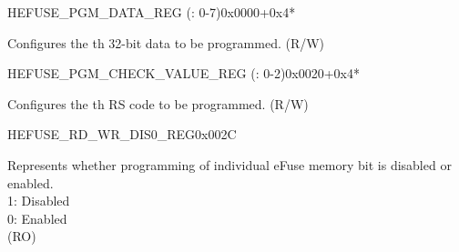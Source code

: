\begin{register}{H}{EFUSE\_PGM\_DATA\_REG (: 0-7)}{0x0000+0x4*}\label{regdesc:EFUSEPGMDATANREG}
    \regnewline%
    \begin{regdesc}\begin{reglist}
    \label{fielddesc:EFUSEPGMDATAN}\item [EFUSE\_PGM\_DATA\_\regindex{n}] Configures the th 32-bit data to be programmed. (R/W)
    \end{reglist}\end{regdesc}
    \end{register}


    \begin{register}{H}{EFUSE\_PGM\_CHECK\_VALUE\_REG (: 0-2)}{0x0020+0x4*}\label{regdesc:EFUSEPGMCHECKVALUENREG}
    \regnewline%
    \begin{regdesc}\begin{reglist}
    \label{fielddesc:EFUSEPGMRSDATAN}\item [EFUSE\_PGM\_RS\_DATA\_\regindex{n}] Configures the th RS code to be programmed. (R/W)
    \end{reglist}\end{regdesc}
    \end{register}


    \begin{register}{H}{EFUSE\_RD\_WR\_DIS0\_REG}{0x002C}\label{regdesc:EFUSERDWRDIS0REG}
    \regnewline%
    \begin{regdesc}\begin{reglist}
    \label{fielddesc:EFUSEWRDIS}\item [EFUSE\_WR\_DIS] Represents whether programming of individual eFuse memory bit is disabled or enabled.\\
    1: Disabled\\
    0: Enabled\\
    (RO)
    \end{reglist}\end{regdesc}
    \end{register}


